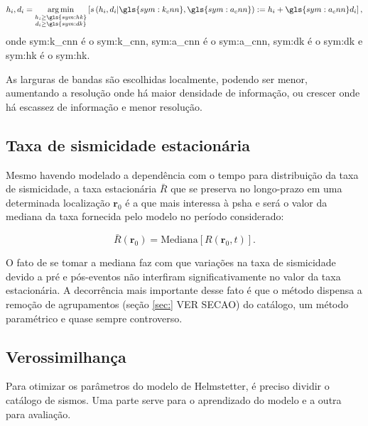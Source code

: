 \begin{equation}
	\ensuremath{
		h_i, d_i = \argmin_{\substack{h_i \ge \gls{sym:hk} \\
						              d_i \ge \gls{sym:dk}}
				           } 
		\left[ s \left(h_i,d_i 
			 		  \arrowvert
					  \gls{sym:k_cnn},\gls{sym:a_cnn}
			     \right) 
			   := h_i + \gls{sym:a_cnn}d_i 
	    \right],
	}
	\label{eq:helms_cnn}
\end{equation}
onde \gls{sym:k_cnn} é o \glsdesc{sym:k_cnn},
	 \gls{sym:a_cnn} é o \glsdesc{sym:a_cnn},
	 \gls{sym:dk} é o \glsdesc{sym:dk} e 
	 \gls{sym:hk} é o \glsdesc{sym:hk}.

As larguras de bandas são escolhidas localmente, podendo ser menor, aumentando a resolução 
onde há maior densidade de informação, ou crescer onde há escassez de informação e menor resolução.


\subsection{Taxa de sismicidade estacionária}
Mesmo havendo modelado a dependência com o tempo para distribuição da taxa de sismicidade,
a taxa estacionária $\bar{R}$ que se preserva no longo-prazo em uma determinada localização  
$\boldsymbol{r}_0$ é a que mais interessa à \gls{psha} e
será o valor da mediana da taxa fornecida pelo modelo no período considerado:

\begin{equation}
	\ensuremath{
		\bar{R}(\boldsymbol{r}_0) = \text{Mediana}\left[R(\boldsymbol{r}_0, t)\right].
	}
	\label{eq:helms_mediana}
\end{equation}

O fato de se tomar a mediana faz com que variações na taxa de sismicidade devido a pré e pós-eventos
não interfiram significativamente no valor da taxa estacionária. A decorrência mais importante desse fato
é que o método dispensa a remoção de agrupamentos (seção \ref{sec:} VER SECAO) do catálogo, um método paramétrico e
quase sempre controverso.

\subsection{Verossimilhança}

Para otimizar os parâmetros do modelo de Helmstetter, é preciso dividir o catálogo de sismos.
Uma parte serve para o aprendizado do modelo e a outra para avaliação.

